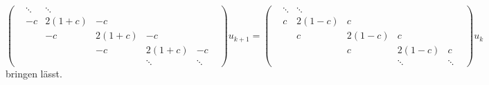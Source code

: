 \begin{equation}
\begin{pmatrix}
&\ddots& \ddots &        &        &        &        \\
&  -c  & 2(1+c) &  -c    &        &        &        \\
&      &  -c    & 2(1+c) &  -c    &        &        \\
&      &        &  -c    & 2(1+c) &  -c    &        \\
&      &        &        & \ddots & \ddots &        
\end{pmatrix}
u_{k+1}
=
\begin{pmatrix}
&\ddots&\ddots  &        &        &        &        \\
&   c  & 2(1-c) &   c    &        &        &        \\
&      &   c    & 2(1-c) &   c    &        &        \\
&      &        &   c    & 2(1-c) &   c    &        \\
&      &        &        &\ddots  & \ddots &        
\end{pmatrix}
u_k
\end{equation}
bringen lässt.

